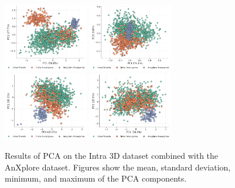 \documentclass[%
 reprint,
 amsmath,amssymb,
 aps,
 floatfix,
 nofootinbib,
]{revtex4-2}
\begin{document}
\begin{figure}[h!]
  \centering
  \includegraphics[width=0.33\textwidth]{pca_mean.png}
  \includegraphics[width=0.33\textwidth]{pca_std.png}
  \includegraphics[width=0.33\textwidth]{pca_min.png}
  \includegraphics[width=0.33\textwidth]{pca_max.png}
  \caption{Results of PCA on the Intra 3D dataset combined with the AnXplore dataset. Figures show the mean, standard deviation, minimum, and maximum of the PCA components.}
  \label{fig:pca_supplementary_all}
\end{figure}

\vspace{-0.55cm}
\end{document}
